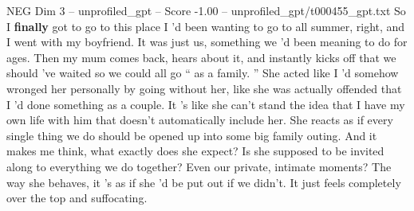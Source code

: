 \begin{textsample}{NEG Dim 3 – unprofiled\_gpt – Score -1.00 – unprofiled\_gpt/t000455\_gpt.txt}  \label{ex:f3_neg_005}
So I \textbf{finally} got to go to this place I ’d been wanting to go to all summer, right, and I went with my boyfriend.
It was just us, something we ’d been meaning to do for ages.
Then my mum comes back, hears about it, and instantly kicks off that we should ’ve waited so we could all go “ as a family. ” She acted like I ’d somehow wronged her personally by going without her, like she was actually offended that I ’d done something as a couple.
It ’s like she can't stand the idea that I have my own life with him that doesn't automatically include her.
She reacts as if every single thing we do should be opened up into some big family outing.
And it makes me think, what exactly does she expect?
Is she supposed to be invited along to everything we do together?
Even our private, intimate moments?
The way she behaves, it ’s as if she ’d be put out if we didn't.
It just feels completely over the top and suffocating.

\end{textsample}

